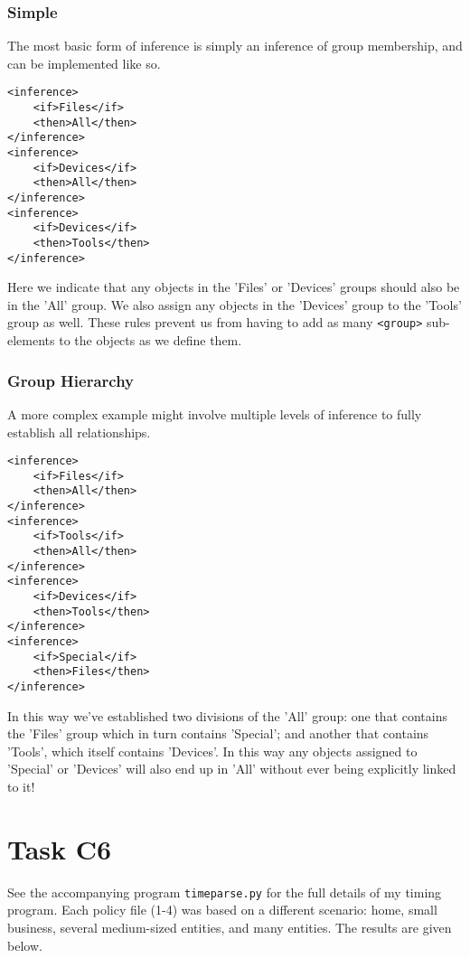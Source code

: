 \documentclass{article}
\providecommand{\task}[1]{\section{Task #1}}
\providecommand{\inlinecode}{\texttt}
\begin{document}
\subsubsection{Simple}
The most basic form of inference is simply an inference of group membership, and can be implemented like so.
\begin{lstlisting}
<inference>
    <if>Files</if>
    <then>All</then>
</inference>
<inference>
    <if>Devices</if>
    <then>All</then>
</inference>
<inference>
    <if>Devices</if>
    <then>Tools</then>
</inference>
\end{lstlisting}
Here we indicate that any objects in the 'Files' or 'Devices' groups should also be in the 'All' group. We also assign any objects in the 'Devices' group to the 'Tools' group as well. These rules prevent us from having to add as many \inlinecode{<group>} sub-elements to the objects as we define them.

\subsubsection{Group Hierarchy}
A more complex example might involve multiple levels of inference to fully establish all relationships.
\begin{lstlisting}
<inference>
    <if>Files</if>
    <then>All</then>
</inference>
<inference>
    <if>Tools</if>
    <then>All</then>
</inference>
<inference>
    <if>Devices</if>
    <then>Tools</then>
</inference>
<inference>
    <if>Special</if>
    <then>Files</then>
</inference>
\end{lstlisting}
In this way we've established two divisions of the 'All' group: one that contains the 'Files' group which in turn contains 'Special'; and another that contains 'Tools', which itself contains 'Devices'. In this way any objects assigned to 'Special' or 'Devices' will also end up in 'All' without ever being explicitly linked to it!

\task{C6}
See the accompanying program \inlinecode{timeparse.py} for the full details of my timing program. Each policy file (1-4) was based on a different scenario: home, small business, several medium-sized entities, and many entities. The results are given below.
\end{document}
